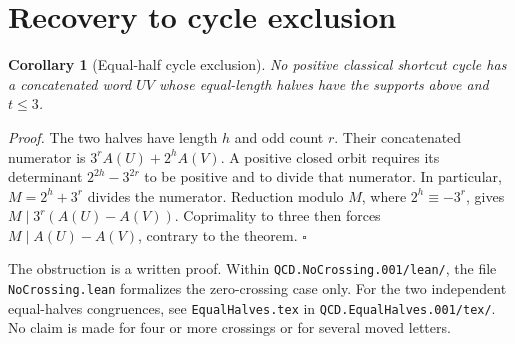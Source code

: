 \documentclass[11pt,letterpaper]{article}
\newtheorem{corollary}[theorem]{Corollary}
\newenvironment{proof}{\noindent\textit{Proof.}}{\hfill\(\square\)}
\begin{document}
\section{Recovery to cycle exclusion}

\begin{corollary}[Equal-half cycle exclusion]
No positive classical shortcut cycle has a concatenated word \(UV\)
whose equal-length halves have the supports above and \(t\le3\).
\end{corollary}
\begin{proof}
The two halves have length \(h\) and odd count \(r\). Their concatenated
numerator is \(3^rA(U)+2^hA(V)\).
A positive closed orbit requires its determinant
\(2^{2h}-3^{2r}\) to be positive and to divide that numerator.
In particular, \(M=2^h+3^r\) divides the numerator.
Reduction modulo \(M\), where \(2^h\equiv-3^r\), gives
\(M\mid3^r(A(U)-A(V))\). Coprimality to three then forces
\(M\mid A(U)-A(V)\), contrary to the theorem.
\end{proof}

The obstruction is a written proof. Within
\nolinkurl{QCD.NoCrossing.001/lean/}, the file
\nolinkurl{NoCrossing.lean} formalizes the zero-crossing case only.
For the two independent equal-halves congruences, see
\nolinkurl{EqualHalves.tex} in \nolinkurl{QCD.EqualHalves.001/tex/}.
No claim is made for four or more crossings or for several moved letters.
\end{document}
